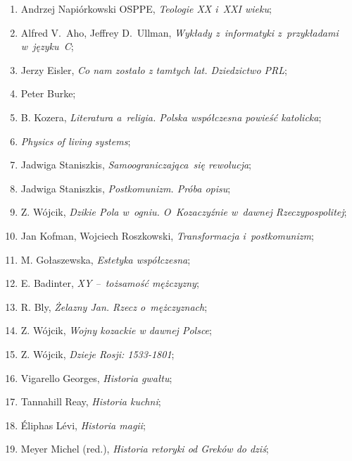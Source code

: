 \documentclass[a4paper,11pt]{article}
\begin{document}
\begin{enumerate}
\item Andrzej Napiórkowski OSPPE, \emph{Teologie XX i~XXI wieku};

\item Alfred V.~Aho, Jeffrey D.~Ullman, \emph{Wykłady z~informatyki
    z~przykładami w~języku~C};

\item Jerzy Eisler, \emph{Co nam zostało z tamtych lat. Dziedzictwo
    PRL};

\item Peter Burke;

\item B. Kozera, \emph{Literatura a~religia. Polska współczesna
    powieść katolicka};

\item \emph{Physics of living systems};

\item Jadwiga Staniszkis, \emph{Samoograniczająca~się rewolucja};

\item Jadwiga Staniszkis, \emph{Postkomunizm. Próba opisu};

\item Z. Wójcik, \emph{Dzikie Pola w~ogniu. O~Kozaczyźnie w~dawnej
    Rzeczypospolitej};

\item Jan Kofman, Wojciech Roszkowski, \emph{Transformacja
    i~postkomunizm};

\item M. Gołaszewska, \emph{Estetyka współczesna};

\item E. Badinter, \emph{XY --~tożsamość mężczyzny};

\item R. Bly, \emph{Żelazny Jan. Rzecz o~mężczyznach};

\item Z. Wójcik, \emph{Wojny kozackie w dawnej Polsce};

\item Z. Wójcik, \emph{Dzieje Rosji: 1533-1801};

\item Vigarello Georges, \emph{Historia gwałtu};

\item Tannahill Reay, \emph{Historia kuchni};

\item Éliphas Lévi, \emph{Historia magii};

\item Meyer Michel (red.), \emph{Historia retoryki od Greków do dziś};


\end{enumerate}
\end{document}
